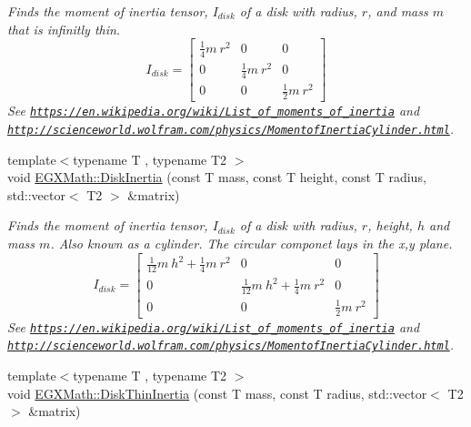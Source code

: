 \begin{DoxyCompactItemize}
\begin{DoxyCompactList}\small\item\em Finds the moment of inertia tensor, $I_{disk}$ of a disk with radius, $r$, and mass $m$ that is infinitly thin. \[ I_{disk}=\begin{bmatrix} \frac{1}{4}m\ r^2 & 0 & 0\\ 0 & \frac{1}{4}m\ r^2 & 0\\ 0 & 0 & \frac{1}{2}m\ r^2 \end{bmatrix} \] See \href{https://en.wikipedia.org/wiki/List_of_moments_of_inertia}{\tt https\+://en.\+wikipedia.\+org/wiki/\+List\+\_\+of\+\_\+moments\+\_\+of\+\_\+inertia} and \href{http://scienceworld.wolfram.com/physics/MomentofInertiaCylinder.html}{\tt http\+://scienceworld.\+wolfram.\+com/physics/\+Momentof\+Inertia\+Cylinder.\+html}. \end{DoxyCompactList}\item 
{\footnotesize template$<$typename T , typename T2 $>$ }\\void \mbox{\hyperlink{group___e_g_x_math-_geometry-3_d-_disk_gad888da52f8bb940380d318a3cac1c048}{E\+G\+X\+Math\+::\+Disk\+Inertia}} (const T mass, const T height, const T radius, std\+::vector$<$ T2 $>$ \&matrix)
\begin{DoxyCompactList}\small\item\em Finds the moment of inertia tensor, $I_{disk}$ of a disk with radius, $r$, height, $h$ and mass $m$. Also known as a cylinder. The circular componet lays in the x,y plane. \[ I_{disk}=\begin{bmatrix} \frac{1}{12}m\ h^2 + \frac{1}{4}m\ r^2 & 0 & 0\\ 0 & \frac{1}{12}m\ h^2 + \frac{1}{4}m\ r^2 & 0\\ 0 & 0 & \frac{1}{2}m\ r^2 \end{bmatrix} \] See \href{https://en.wikipedia.org/wiki/List_of_moments_of_inertia}{\tt https\+://en.\+wikipedia.\+org/wiki/\+List\+\_\+of\+\_\+moments\+\_\+of\+\_\+inertia} and \href{http://scienceworld.wolfram.com/physics/MomentofInertiaCylinder.html}{\tt http\+://scienceworld.\+wolfram.\+com/physics/\+Momentof\+Inertia\+Cylinder.\+html}. \end{DoxyCompactList}\item 
{\footnotesize template$<$typename T , typename T2 $>$ }\\void \mbox{\hyperlink{group___e_g_x_math-_geometry-3_d-_disk_ga99e3f61c70ecd4c99c6f3c59d5ad6a4f}{E\+G\+X\+Math\+::\+Disk\+Thin\+Inertia}} (const T mass, const T radius, std\+::vector$<$ T2 $>$ \&matrix)

\end{DoxyCompactItemize}
